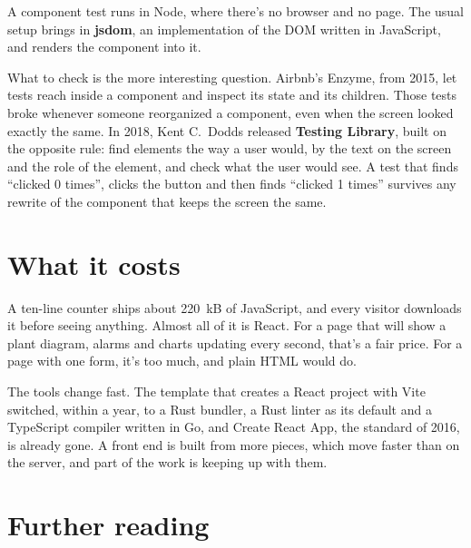 A component test runs in Node, where there's no browser and no page. The usual
setup brings in \textbf{jsdom}, an implementation of the DOM written in
JavaScript, and renders the component into it.

What to check is the more interesting question. Airbnb's Enzyme, from 2015, let
tests reach inside a component and inspect its state and its children. Those
tests broke whenever someone reorganized a component, even when the screen
looked exactly the same. In 2018, Kent C.\ Dodds released
\textbf{Testing Library}, built on the opposite rule: find elements the way a
user would, by the text on the screen and the role of the element, and check
what the user would see. A test that finds ``clicked 0 times'', clicks the
button and then finds ``clicked 1 times'' survives any rewrite of the component
that keeps the screen the same.

\section{What it costs}

A ten-line counter ships about 220~kB of JavaScript, and every visitor downloads
it before seeing anything. Almost all of it is React. For a page that will
show a plant diagram, alarms and charts updating every second, that's a fair
price. For a page with one form, it's too much, and plain HTML would do.

The tools change fast. The template that creates a React project with Vite
switched, within a year, to a Rust bundler, a Rust linter as its default and a
TypeScript compiler written in Go, and Create React App, the standard of 2016,
is already gone. A front end is built from more pieces, which move faster than
on the server, and part of the work is keeping up with them.

\section*{Further reading}

